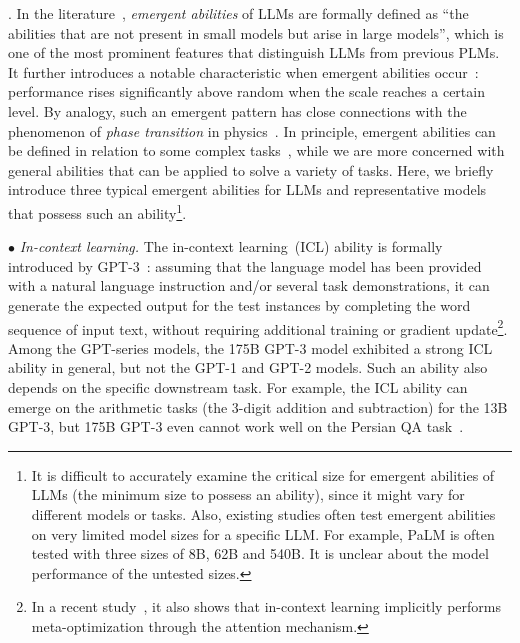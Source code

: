 .  In the literature~\cite{Wei-arxiv-2022-Emergent}, \emph{emergent abilities} of LLMs are formally defined as ``the abilities that are not present in small models but arise in large models'',  which is one of the most prominent features that distinguish LLMs from previous PLMs. 
It further introduces a notable characteristic when emergent abilities occur~\cite{Wei-arxiv-2022-Emergent}:  performance 
rises significantly above random when the scale reaches a certain level. By analogy, such an emergent pattern has close connections with the phenomenon of  \emph{phase transition} in physics~\cite{Wei-arxiv-2022-Emergent,Huberman-AI-1987-phase}. In principle, emergent abilities can be  defined in relation to some complex tasks~\cite{Rae-arxiv-2021-Scaling,Wei-arxiv-2022-Emergent}, while we are more concerned with general abilities that can be applied to solve a variety of  tasks. Here, we briefly introduce three typical emergent abilities for LLMs and  representative models that possess such an ability\footnote{It is difficult to accurately examine the critical size for emergent abilities of LLMs (\ie the minimum size to possess an ability), since it might vary for different models or tasks. Also, existing studies often test emergent abilities on very limited model sizes for a specific LLM. For example, PaLM is often tested with three sizes of 8B, 62B and 540B. It is unclear about the model performance of the untested  sizes.}. 


$\bullet$ \emph{In-context learning.}  
{The in-context learning~(ICL) ability is formally introduced by GPT-3~\cite{Brown-NeurIPS-2020-Language}: assuming that the language model has been provided with a natural language instruction and/or  several task demonstrations, it can generate the expected output for the test instances by completing the word sequence of input text, without requiring additional training or gradient update\footnote{In a recent study~\cite{Dai-arxiv-2022-Why}, it also shows that in-context learning implicitly performs meta-optimization through the attention mechanism.}.} 
Among the GPT-series models, the 175B GPT-3 model exhibited a strong ICL ability in general, but not the GPT-1 and GPT-2 models. 
Such an ability also depends on the specific downstream task. For example, the ICL ability can emerge on the arithmetic tasks (\eg the 3-digit addition and subtraction) for the 13B GPT-3, but 175B GPT-3 even cannot work well on the Persian QA task~\cite{Wei-arxiv-2022-Emergent}.



